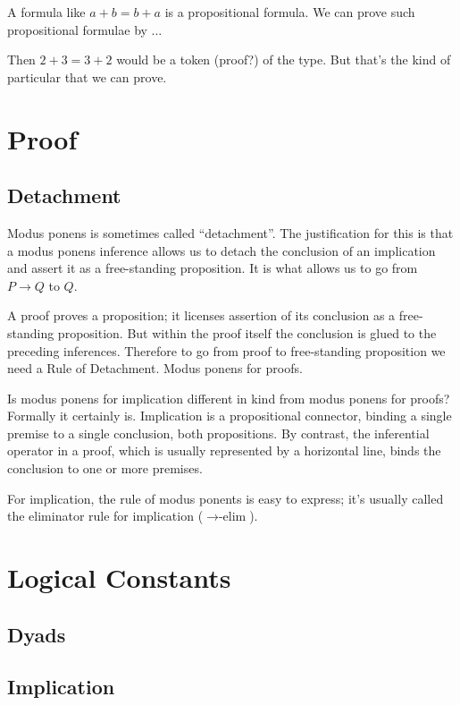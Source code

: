 \documentclass{article}
\begin{document}
A formula like \(a+b=b+a\) is a propositional formula. We can
prove such propositional formulae by ...

Then \(2+3=3+2\) would be a token (proof?) of the type. But that's the
kind of particular that we can prove.

\section{Proof}

\subsection{Detachment}

Modus ponens is sometimes called ``detachment''. The justification for
this is that a modus ponens inference allows us to detach the
conclusion of an implication and assert it as a free-standing
proposition. It is what allows us to go from \(P\rightarrow Q\) to
\(Q\).

A proof proves a proposition; it licenses assertion of its conclusion
as a free-standing proposition. But within the proof itself the
conclusion is glued to the preceding inferences. Therefore to go from
proof to free-standing proposition we need a Rule of Detachment. Modus
ponens for proofs.

Is modus ponens for implication different in kind from modus ponens
for proofs? Formally it certainly is. Implication is a propositional
connector, binding a single premise to a single conclusion, both
propositions. By contrast, the inferential operator in a proof, which
is usually represented by a horizontal line, binds the conclusion to
one or more premises.

For implication, the rule of modus ponents is easy to express; it's
usually called the eliminator rule for implication
(\(\rightarrow\text{-elim}\)).

\section{Logical Constants}

\subsection{Dyads}

\subsection{Implication}
\end{document}
